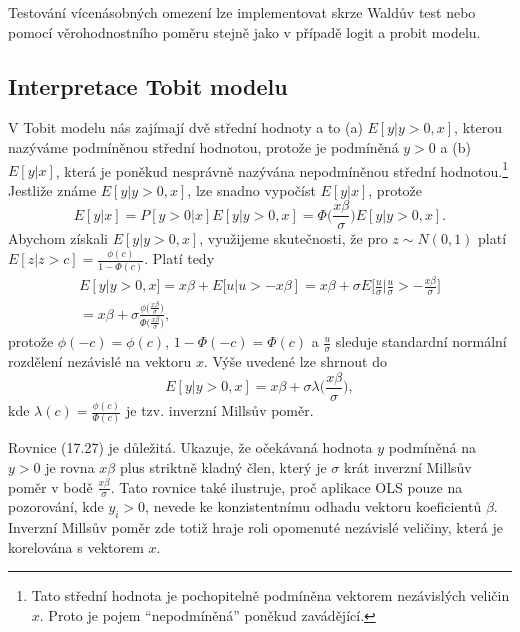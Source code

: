 Testování vícenásobných omezení lze implementovat skrze Waldův test nebo pomocí věrohodnostního poměru stejně jako v případě logit a probit modelu.

\subsection{Interpretace Tobit modelu}

V Tobit modelu nás zajímají dvě střední hodnoty a to (a) $E[y|y > 0, x]$, kterou nazýváme podmíněnou střední hodnotou, protože je podmíněná $y > 0$ a (b) $E[y|x]$, která je poněkud nesprávně nazývána nepodmíněnou střední hodnotou.\footnote{Tato střední hodnota je pochopitelně podmíněna vektorem nezávislých veličin $x$. Proto je pojem ``nepodmíněná'' poněkud zavádějící.} Jestliže známe $E[y | y > 0, x]$, lze snadno vypočíst $E[y|x]$, protože
\begin{equation}
E[y|x] = P[y > 0 | x] E[y | y > 0, x] = \Phi\Big(\frac{x \beta}{\sigma}\Big)E[y | y > 0, x].
\end{equation}
Abychom získali $E[y|y > 0, x]$, využijeme skutečnosti, že pro $z \sim N(0, 1)$ platí $E[z | z > c] = \frac{\phi(c)}{1 - \Phi(c)}$. Platí tedy
\begin{multline}
E[y | y > 0, x] = x \beta + E[u | u > -x \beta] = x \beta + \sigma E\Big[\frac{u}{\sigma}| \frac{u}{\sigma} > -\frac{x\beta}{\sigma}\Big]\\
= x \beta + \sigma \frac{\phi\Big(\frac{x \beta}{\sigma}\Big)}{\Phi\Big(\frac{x \beta}{\sigma}\Big)},
\end{multline}
protože $\phi(-c) = \phi(c)$, $1 - \Phi(-c) = \Phi(c)$ a $\frac{u}{\sigma}$ sleduje standardní normální rozdělení nezávislé na vektoru $x$. Výše uvedené lze shrnout do
\begin{equation}
E[y|y>0, x] = x \beta + \sigma \lambda \Big(\frac{x \beta}{\sigma}\Big),
\end{equation}
kde $\lambda(c) = \frac{\phi(c)}{\Phi(c)}$ je tzv. inverzní Millsův poměr.

Rovnice (17.27) je důležitá. Ukazuje, že očekávaná hodnota $y$ podmíněná na $y > 0$ je rovna $x \beta$ plus striktně kladný člen, který je $\sigma$ krát inverzní Millsův poměr v bodě $\frac{x \beta}{\sigma}$. Tato rovnice také ilustruje, proč aplikace OLS pouze na pozorování, kde $y_i > 0$, nevede ke konzistentnímu odhadu vektoru koeficientů $\beta$. Inverzní Millsův poměr zde totiž hraje roli opomenuté nezávislé veličiny, která je korelována s vektorem $x$.

